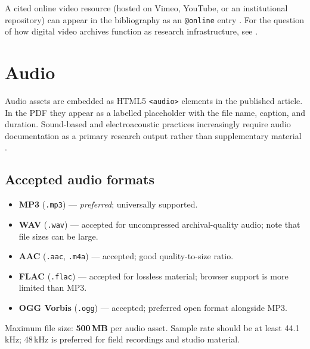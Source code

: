 
A cited online video resource (hosted on Vimeo, YouTube, or an
institutional repository) can appear in the bibliography
as an \texttt{@online} entry \citep{video_example}. For the question
of how digital video archives function as research infrastructure,
see \citet{andersen2022embodied}.

\section{Audio}

Audio assets are embedded as HTML5 \texttt{<audio>} elements in the
published article. In the PDF they appear as a labelled placeholder
with the file name, caption, and duration. Sound-based and
electroacoustic practices increasingly require audio documentation as a
primary research output rather than supplementary material
\citep{lee2023sound}.

\subsection{Accepted audio formats}

\begin{itemize}
  \item \textbf{MP3} (\texttt{.mp3}) --- \emph{preferred}; universally
    supported.
  \item \textbf{WAV} (\texttt{.wav}) --- accepted for uncompressed
    archival-quality audio; note that file sizes can be large.
  \item \textbf{AAC} (\texttt{.aac}, \texttt{.m4a}) --- accepted;
    good quality-to-size ratio.
  \item \textbf{FLAC} (\texttt{.flac}) --- accepted for lossless
    material; browser support is more limited than MP3.
  \item \textbf{OGG Vorbis} (\texttt{.ogg}) --- accepted; preferred
    open format alongside MP3.
\end{itemize}

Maximum file size: \textbf{500\,MB} per audio asset. Sample rate should
be at least 44.1\,kHz; 48\,kHz is preferred for field recordings and
studio material.

